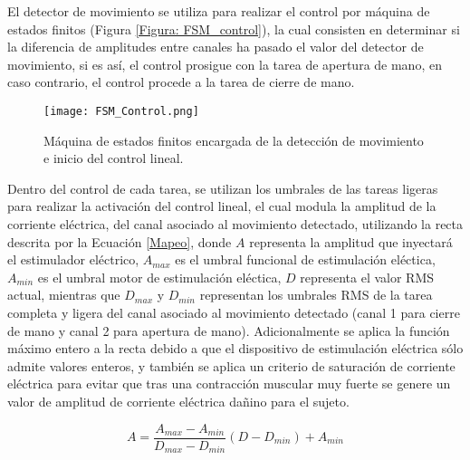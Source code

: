El detector de movimiento se utiliza para realizar el control por máquina de estados finitos (Figura \ref{Figura: FSM_control}), la cual consisten en determinar si la diferencia de amplitudes entre canales ha pasado el valor del detector de movimiento, si es así, el control prosigue con la tarea de apertura de mano, en caso contrario, el control procede a la tarea de cierre de mano.

\begin{figure}[htbp]
	\centering
	\texttt{[image: FSM\_Control.png]}
	\caption{Máquina de estados finitos encargada de la detección de movimiento e inicio del control lineal.}
	\label{Figura: FSM_Control}
\end{figure}

Dentro del control de cada tarea, se utilizan los umbrales de las tareas ligeras para realizar la activación del control lineal, el cual modula la amplitud de la corriente eléctrica, del canal asociado al movimiento detectado, utilizando la recta descrita por la Ecuación \ref{Mapeo}, donde $A$ representa la amplitud que inyectará el estimulador eléctrico, $A_{max}$ es el umbral funcional de estimulación eléctica, $A_{min}$ es el umbral motor de estimulación eléctica, $D$ representa el valor RMS actual, mientras que $D_{max}$ y $D_{min}$ representan los umbrales RMS de la tarea completa y ligera del canal asociado al movimiento detectado (canal 1 para cierre de mano y canal 2 para apertura de mano). Adicionalmente se aplica la función máximo entero a la recta debido a que el dispositivo de estimulación eléctrica sólo admite valores enteros, y también se aplica un criterio de saturación de corriente eléctrica para evitar que tras una contracción muscular muy fuerte se genere un valor de amplitud de corriente eléctrica dañino para el sujeto.

\begin{equation}
	A = \frac{A_{max} - A_{min}}{D_{max} - D_{min}}(D - D_{min}) + A_{min}
	\label{Mapeo}
\end{equation}

